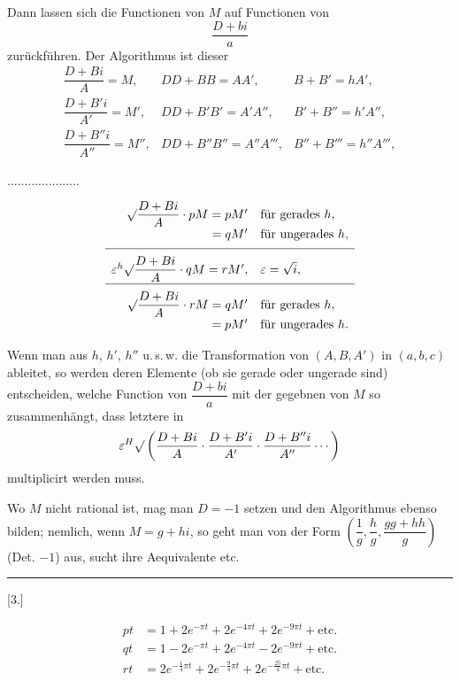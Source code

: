 Dann lassen sich die Functionen von $M$ auf Functionen von
\[
\frac{D+bi}{a}
\]
zurückführen. Der Algorithmus ist dieser
\[
\begin{array}{ccc}
\dfrac{D+Bi}{A}=M,&DD+BB=AA',&B+B'=hA',\\[4pt]
\dfrac{D+B'i}{A'}=M',&DD+B'B'=A'A'',&B'+B''=h'A'',\\[4pt]
\dfrac{D+B''i}{A''}=M'',&DD+B''B''=A''A''',&B''+B'''=h''A''',
\end{array}
\]
\begin{center}.\quad .\quad .\quad .\quad .\quad .\quad .\quad .\quad .\quad .\quad .\quad .\quad .\quad .\quad .\quad .\quad .\quad .\quad .\quad .\quad .\end{center}
\[
\begin{array}{rl}
\mathord{\surd}\dfrac{D+Bi}{A}\cdot pM=pM'&\text{für gerades }h,\\[4pt]
{}=qM'&\text{für ungerades }h,\\[5pt]\hline\\[-6pt]
\varepsilon^h\mathord{\surd}\dfrac{D+Bi}{A}\cdot qM=rM',&\varepsilon=\sqrt{i},\\[5pt]\hline\\[-6pt]
\mathord{\surd}\dfrac{D+Bi}{A}\cdot rM=qM'&\text{für gerades }h,\\[4pt]
{}=pM'&\text{für ungerades }h.
\end{array}
\]

Wenn man aus $h$, $h'$, $h''$ u.\,s.\,w. die Transformation von $(A,B,A')$ in $(a,b,c)$ ableitet, so werden deren Elemente (ob sie gerade oder ungerade sind) entscheiden, welche Function von $\dfrac{D+bi}{a}$ mit der gegebnen von $M$ so zusammenhängt, dass letztere in
\[
\varepsilon^H\mathord{\surd}\left(\dfrac{D+Bi}{A}\cdot\dfrac{D+B'i}{A'}\cdot\dfrac{D+B''i}{A''}\cdots\right)
\]
multiplicirt werden muss.

Wo $M$ nicht rational ist, mag man $D=-1$ setzen und den Algorithmus ebenso bilden; nemlich, wenn $M=g+hi$, so geht man von der Form $\left(\dfrac1g,\dfrac hg,\dfrac{gg+hh}{g}\right)$ (Det. $-1$) aus, sucht ihre Aequivalente etc.

\begin{center}\rule{3cm}{.4pt}\end{center}
\begin{center}[3.]\end{center}
\[
\begin{aligned}
pt&=1+2e^{-\pi t}+2e^{-4\pi t}+2e^{-9\pi t}+\text{etc.}\\
qt&=1-2e^{-\pi t}+2e^{-4\pi t}-2e^{-9\pi t}+\text{etc.}\\
rt&=2e^{-\frac14\pi t}+2e^{-\frac94\pi t}+2e^{-\frac{25}4\pi t}+\text{etc.}
\end{aligned}
\]

